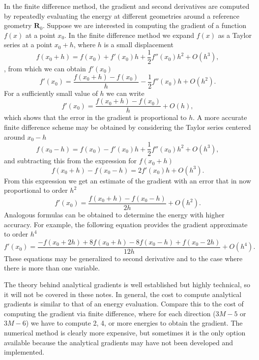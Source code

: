 \documentclass[../Main/chem532-notes.tex]{subfiles}
\begin{document}
In the finite difference method, the gradient and second derivatives are computed by repeatedly evaluating the energy at different geometries around a reference geometry $\mathbf{R}_0$.
Suppose we are interested in computing the gradient of a function $f(x)$ at a point $x_0$. In the finite difference method we expand $f(x)$ as a Taylor series at a point $x_0 + h$, where $h$ is a small displacement
\begin{equation}
f(x_0 + h) = f(x_0) + f'(x_0) h + \frac{1}{2} f''(x_0) h^2 + O(h^3),
\end{equation},
from which we can obtain $f'(x_0)$
\begin{equation}
f'(x_0) = \frac{f(x_0 + h) -f(x_0)}{h} - \frac{1}{2} f''(x_0) h + O(h^2).
\end{equation}
For a sufficiently small value of $h$ we can write
\begin{equation}
f'(x_0) = \frac{f(x_0 + h) -f(x_0)}{h} + O(h),
\end{equation}
which shows that the error in the gradient is proportional to $h$.
A more accurate finite difference scheme may be obtained by considering the Taylor series centered around $x_0 - h$
\begin{equation}
f(x_0 - h) = f(x_0) - f'(x_0) h + \frac{1}{2} f''(x_0) h^2 + O(h^3),
\end{equation}
and subtracting this from the expression for $f(x_0 + h)$
\begin{equation}
f(x_0 + h) - f(x_0 - h) = 2 f'(x_0) h + O(h^3).
\end{equation}
From this expression we get an estimate of the gradient with an error that in now proportional to order $h^2$
\begin{equation}
f'(x_0) = \frac{f(x_0 + h) - f(x_0 - h)}{2h} + O(h^2).
\end{equation}
Analogous formulas can be obtained to determine the energy with higher accuracy. For example, the following equation provides the gradient approximate to order $h^4$
\begin{equation}
f'(x_0) = \frac{-f(x_0 + 2h) + 8 f(x_0 + h)- 8f(x_0 - h) + f(x_0 - 2h)}{12h} + O(h^4).
\end{equation}
These equations may be generalized to second derivative and to the case where there is more than one variable.

The theory behind analytical gradients is well established but highly technical, so it will not be covered in these notes. In general, the cost to compute analytical gradients is similar to that of an energy evaluation. Compare this to the cost of computing the gradient via finite difference, where for each direction ($3M-5$ or $3M-6$) we have to compute 2, 4, or more energies to obtain the gradient.
The numerical method is clearly more expensive, but sometimes it is the only option available because the analytical gradients may have not been developed and implemented.
\end{document}
